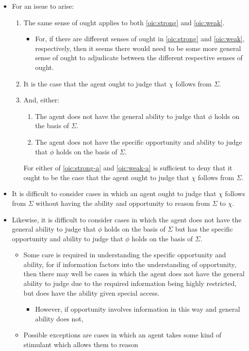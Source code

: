 \documentclass[10pt]{article}
\begin{document}
\begin{itemize}
\item For an issue to arise:
  \begin{enumerate}
  \item The same sense of ought applies to both \ref{oic:strong} and \ref{oic:weak}.
    \begin{itemize}
    \item For, if there are different senses of ought in \ref{oic:strong} and \ref{oic:weak}, respectively, then it seems there would need to be some more general sense of ought to adjudicate between the different respective senses of ought.
    \end{itemize}
  \item It is the case that the agent ought to judge that \(\chi\) follows from \(\Sigma\).
  \item And, either:
    \begin{enumerate}
    \item\label{oic:strong-a} The agent does not have the general ability to judge that \(\phi\) holds on the basis of \(\Sigma\).
    \item\label{oic:weak-a} The agent does not have the specific opportunity and ability to judge that \(\phi\) holds on the basis of \(\Sigma\).
    \end{enumerate}
    For either of \ref{oic:strong-a} and \ref{oic:weak-a} is sufficient to deny that it ought to be the case that the agent ought to judge that \(\chi\) follows from \(\Sigma\).
  \end{enumerate}
\end{itemize}

\begin{itemize}
\item It is difficult to consider cases in which an agent ought to judge that \(\chi\) follows from \(\Sigma\) without having the ability and opportunity to reason from \(\Sigma\) to \(\chi\).
\item Likewise, it is difficult to consider cases in which the agent does not have the general ability to judge that \(\phi\) holds on the basis of \(\Sigma\) but has the specific opportunity and ability to judge that \(\phi\) holds on the basis of \(\Sigma\).
  \begin{itemize}
  \item Some care is required in understanding the specific opportunity and ability, for if information factors into the understanding of opportunity, then there may well be cases in which the agent does not have the general ability to judge due to the required information being highly restricted, but does have the ability given special access.
    \begin{itemize}
    \item However, if opportunity involves information in this way and general ability does not,
    \end{itemize}
  \item Possible exceptions are cases in which an agent takes some kind of stimulant which allows them to reason
  \end{itemize}
\end{itemize}
\end{document}
